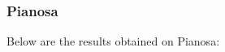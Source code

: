 \subsubsection*{Pianosa}
\label{test-env-pianosa}
Below are the results obtained on Pianosa:
%
%
%


